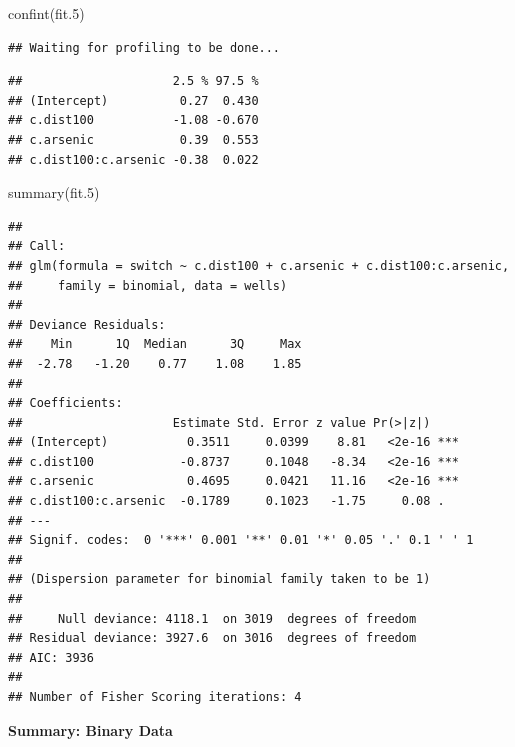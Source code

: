 \documentclass[
]{article}
\newenvironment{Shaded}{\begin{snugshade}}{\end{snugshade}}
\newcommand{\FloatTok}[1]{\textcolor[rgb]{0.00,0.00,0.81}{#1}}
\newcommand{\FunctionTok}[1]{\textcolor[rgb]{0.00,0.00,0.00}{#1}}
\newcommand{\NormalTok}[1]{#1}
\begin{document}
\begin{Shaded}
\begin{Highlighting}[]
\FunctionTok{confint}\NormalTok{(fit}\FloatTok{.5}\NormalTok{)}
\end{Highlighting}
\end{Shaded}

\begin{verbatim}
## Waiting for profiling to be done...
\end{verbatim}

\begin{verbatim}
##                     2.5 % 97.5 %
## (Intercept)          0.27  0.430
## c.dist100           -1.08 -0.670
## c.arsenic            0.39  0.553
## c.dist100:c.arsenic -0.38  0.022
\end{verbatim}

\begin{Shaded}
\begin{Highlighting}[]
\FunctionTok{summary}\NormalTok{(fit}\FloatTok{.5}\NormalTok{)}
\end{Highlighting}
\end{Shaded}

\begin{verbatim}
## 
## Call:
## glm(formula = switch ~ c.dist100 + c.arsenic + c.dist100:c.arsenic, 
##     family = binomial, data = wells)
## 
## Deviance Residuals: 
##    Min      1Q  Median      3Q     Max  
##  -2.78   -1.20    0.77    1.08    1.85  
## 
## Coefficients:
##                     Estimate Std. Error z value Pr(>|z|)    
## (Intercept)           0.3511     0.0399    8.81   <2e-16 ***
## c.dist100            -0.8737     0.1048   -8.34   <2e-16 ***
## c.arsenic             0.4695     0.0421   11.16   <2e-16 ***
## c.dist100:c.arsenic  -0.1789     0.1023   -1.75     0.08 .  
## ---
## Signif. codes:  0 '***' 0.001 '**' 0.01 '*' 0.05 '.' 0.1 ' ' 1
## 
## (Dispersion parameter for binomial family taken to be 1)
## 
##     Null deviance: 4118.1  on 3019  degrees of freedom
## Residual deviance: 3927.6  on 3016  degrees of freedom
## AIC: 3936
## 
## Number of Fisher Scoring iterations: 4
\end{verbatim}

\textbf{Summary: Binary Data}
\end{document}
